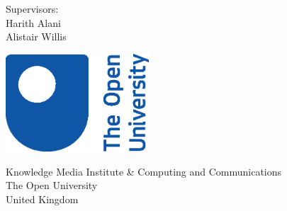 \begin{titlepage}
    \begin{center}
        \vspace*{1cm}
            
        \Huge
        \textbf{\thetitle}
            
        \vspace{0.5cm}
        \LARGE
        \makeatletter \@subtitle \makeatother %
            
        \vspace{1.5cm}
            
        \textbf{\theauthor}
            
        \vfill
            
        Supervisors:\\
        Harith Alani\\
        Alistair Willis
            
        \vspace{0.8cm}
            
        \includegraphics[width=0.4\textwidth]{images/OU-logo-2017.eps}
        
        
        \vspace{0.8cm}
            
        \Large
        Knowledge Media Institute \& Computing and Communications\\
        The Open University\\
        United Kingdom\\
        \thedate
            
    \end{center}
\end{titlepage}